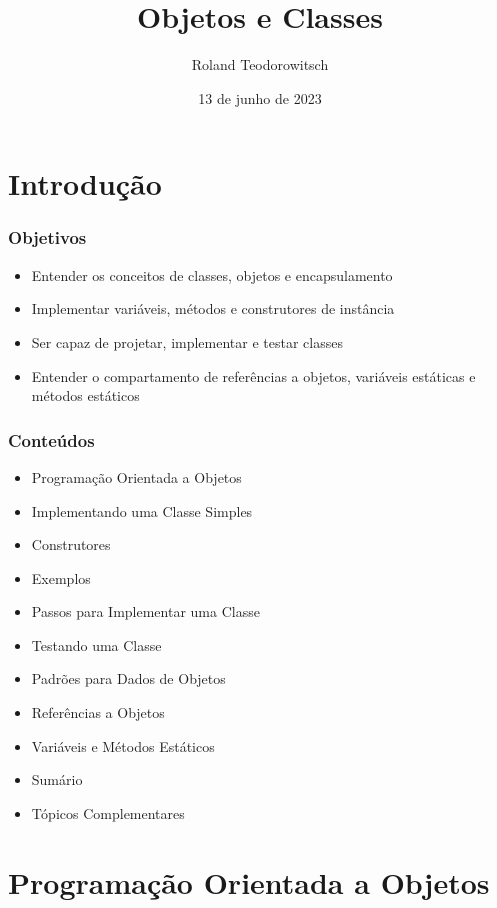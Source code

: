 \documentclass[xcolor={dvipsnames,table},aspectratio=169]{beamer}
\title[\sc{Objetos e Classes}]{Objetos e Classes}
\author[Roland Teodorowitsch]{Roland Teodorowitsch}
\institute[FPROG - EP - PUCRS]{Fundamentos de Programação - Escola Politécnica - PUCRS}
\date{13 de junho de 2023}
\begin{document}
\justifying

\begin{frame}
	\titlepage
\end{frame}

\section{Introdução}

\begin{frame}\frametitle{Objetivos}
\begin{itemize}
	\item Entender os conceitos de classes, objetos e encapsulamento
	\item Implementar variáveis, métodos e construtores de instância
	\item Ser capaz de projetar, implementar e testar classes
	\item Entender o compartamento de referências a objetos, variáveis estáticas e métodos estáticos
\end{itemize}
\end{frame}

\begin{frame}\frametitle{Conteúdos}
\begin{itemize}
	\item Programação Orientada a Objetos
	\item Implementando uma Classe Simples
	\item Construtores
	\item Exemplos
	\item Passos para Implementar uma Classe

	\item Testando uma Classe
	\item Padrões para Dados de Objetos
	\item Referências a Objetos
	\item Variáveis e Métodos Estáticos
	\item Sumário
	\item Tópicos Complementares
\end{itemize}
\end{frame}

\section{Programação Orientada a Objetos}
\end{document}
